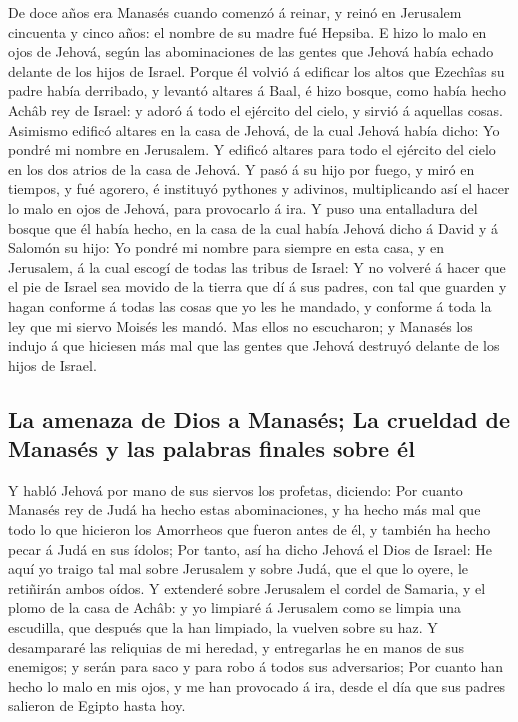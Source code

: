  De doce años era Manasés cuando comenzó á reinar, y reinó
en Jerusalem cincuenta y cinco años: el nombre de su madre fué Hepsiba.
 E hizo lo malo en ojos de Jehová, según las abominaciones
de las gentes que Jehová había echado delante de los hijos de Israel.
 Porque él volvió á edificar los altos que Ezechîas su padre
había derribado, y levantó altares á Baal, é hizo bosque, como había
hecho Achâb rey de Israel: y adoró á todo el ejército del cielo, y
sirvió á aquellas cosas.  Asimismo edificó altares en la
casa de Jehová, de la cual Jehová había dicho: Yo pondré mi nombre en
Jerusalem.  Y edificó altares para todo el ejército del
cielo en los dos atrios de la casa de Jehová.  Y pasó á su
hijo por fuego, y miró en tiempos, y fué agorero, é instituyó pythones y
adivinos, multiplicando así el hacer lo malo en ojos de Jehová, para
provocarlo á ira.  Y puso una entalladura del bosque que él
había hecho, en la casa de la cual había Jehová dicho á David y á
Salomón su hijo: Yo pondré mi nombre para siempre en esta casa, y en
Jerusalem, á la cual escogí de todas las tribus de Israel: 
Y no volveré á hacer que el pie de Israel sea movido de la tierra que dí
á sus padres, con tal que guarden y hagan conforme á todas las cosas que
yo les he mandado, y conforme á toda la ley que mi siervo Moisés les
mandó.  Mas ellos no escucharon; y Manasés los indujo á que
hiciesen más mal que las gentes que Jehová destruyó delante de los hijos
de Israel.

\hypertarget{la-amenaza-de-dios-a-manasuxe9s-la-crueldad-de-manasuxe9s-y-las-palabras-finales-sobre-uxe9l}{%
\subsection{La amenaza de Dios a Manasés; La crueldad de Manasés y las
palabras finales sobre
él}\label{la-amenaza-de-dios-a-manasuxe9s-la-crueldad-de-manasuxe9s-y-las-palabras-finales-sobre-uxe9l}}

 Y habló Jehová por mano de sus siervos los profetas,
diciendo:  Por cuanto Manasés rey de Judá ha hecho estas
abominaciones, y ha hecho más mal que todo lo que hicieron los Amorrheos
que fueron antes de él, y también ha hecho pecar á Judá en sus ídolos;
 Por tanto, así ha dicho Jehová el Dios de Israel: He aquí
yo traigo tal mal sobre Jerusalem y sobre Judá, que el que lo oyere, le
retiñirán ambos oídos.  Y extenderé sobre Jerusalem el
cordel de Samaria, y el plomo de la casa de Achâb: y yo limpiaré á
Jerusalem como se limpia una escudilla, que después que la han limpiado,
la vuelven sobre su haz.  Y desampararé las reliquias de mi
heredad, y entregarlas he en manos de sus enemigos; y serán para saco y
para robo á todos sus adversarios;  Por cuanto han hecho lo
malo en mis ojos, y me han provocado á ira, desde el día que sus padres
salieron de Egipto hasta hoy.

